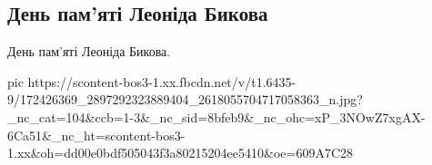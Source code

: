  
 
 
 
 

\subsection{День пам'яті Леоніда Бикова}

День пам'яті Леоніда Бикова.

\ifcmt
  pic https://scontent-bos3-1.xx.fbcdn.net/v/t1.6435-9/172426369_2897292323889404_2618055704717058363_n.jpg?_nc_cat=104&ccb=1-3&_nc_sid=8bfeb9&_nc_ohc=xP_3NOwZ7xgAX-6Ca51&_nc_ht=scontent-bos3-1.xx&oh=dd00e0bdf505043f3a80215204ee5410&oe=609A7C28
\fi

